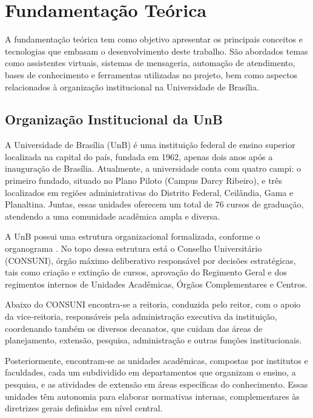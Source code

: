\chapter[Fundamentação Teórica]{Fundamentação Teórica}

A fundamentação teórica tem como objetivo apresentar os principais conceitos e tecnologias que embasam o desenvolvimento deste trabalho. São abordados temas como assistentes virtuais, sistemas de mensageria, automação de atendimento, bases de conhecimento e ferramentas utilizadas no projeto, bem como aspectos relacionados à organização institucional na Universidade de Brasília.

\section{Organização Institucional da UnB}

A Universidade de Brasília (UnB) é uma instituição federal de ensino superior localizada na capital do país, fundada em 1962, apenas dois anos após a inauguração de Brasília. Atualmente, a universidade conta com quatro campi: o primeiro fundado, situado no Plano Piloto (Campus Darcy Ribeiro), e três localizados em regiões administrativas do Distrito Federal, Ceilândia, Gama e Planaltina. Juntas, essas unidades oferecem um total de 76 cursos de graduação, atendendo a uma comunidade acadêmica ampla e diversa. 

A UnB possui uma estrutura organizacional formalizada, conforme o organograma \cite{organogramaUnB2017}. No topo dessa estrutura está o Conselho Universitário (CONSUNI), órgão máximo deliberativo responsável por decisões estratégicas, tais como criação e extinção de cursos, aprovação do Regimento Geral e dos regimentos internos de Unidades Acadêmicas, Órgãos Complementares e Centros.

Abaixo do CONSUNI encontra-se a reitoria, conduzida pelo reitor, com o apoio da vice‑reitoria, responsáveis pela administração executiva da instituição, coordenando também os diversos decanatos, que cuidam das áreas de planejamento, extensão, pesquisa, administração e outras funções institucionais.

Posteriormente, encontram-se as unidades acadêmicas, compostas por institutos e faculdades, cada um subdividido em departamentos que organizam o ensino, a pesquisa, e as atividades de extensão em áreas específicas do conhecimento. Essas unidades têm autonomia para elaborar normativas internas, complementares às diretrizes gerais definidas em nível central.


